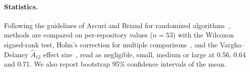 \paragraph{Statistics.} Following the guidelines of Arcuri and Briand for randomized
algorithms~\cite{arcuri2011stats}, methods are compared on per-repository values ($n = 53$) with
the Wilcoxon signed-rank test, Holm's correction for multiple comparisons~\cite{holm1979}, and the
Vargha--Delaney $\hat{A}_{12}$ effect size~\cite{vargha2000a12}, read as negligible, small, medium
or large at 0.56, 0.64 and 0.71. We also report bootstrap 95\% confidence intervals of the mean.
